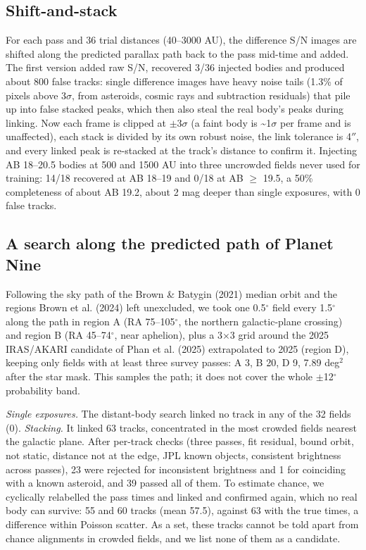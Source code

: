 \documentclass[twocolumn]{aastex631}
\begin{document}
\subsection{Shift-and-stack}
For each pass and 36 trial distances (40--3000 AU), the difference S/N images are shifted along the predicted parallax path back to the pass mid-time and added. The first version added raw S/N, recovered 3/36 injected bodies and produced about 800 false tracks: single difference images have heavy noise tails (1.3\% of pixels above 3$\sigma$, from asteroids, cosmic rays and subtraction residuals) that pile up into false stacked peaks, which then also steal the real body's peaks during linking. Now each frame is clipped at $\pm$3$\sigma$ (a faint body is \textasciitilde{}1$\sigma$ per frame and is unaffected), each stack is divided by its own robust noise, the link tolerance is 4$''$, and every linked peak is re-stacked at the track's distance to confirm it. Injecting AB 18--20.5 bodies at 500 and 1500 AU into three uncrowded fields never used for training: 14/18 recovered at AB 18--19 and 0/18 at AB $\ge$ 19.5, a 50\% completeness of about AB 19.2, about 2 mag deeper than single exposures, with 0 false tracks.

\subsection{A search along the predicted path of Planet Nine}
Following the sky path of the Brown \& Batygin (2021) median orbit and the regions Brown et al. (2024) left unexcluded, we took one 0.5$^\circ$ field every 1.5$^\circ$ along the path in region A (RA 75--105$^\circ$, the northern galactic-plane crossing) and region B (RA 45--74$^\circ$, near aphelion), plus a 3$\times$3 grid around the 2025 IRAS/AKARI candidate of Phan et al. (2025) extrapolated to 2025 (region D), keeping only fields with at least three survey passes: A 3, B 20, D 9, 7.89 deg$^2$ after the star mask. This samples the path; it does not cover the whole $\pm$12$^\circ$ probability band.

\emph{Single exposures.} The distant-body search linked no track in any of the 32 fields (0). \emph{Stacking.} It linked 63 tracks, concentrated in the most crowded fields nearest the galactic plane. After per-track checks (three passes, fit residual, bound orbit, not static, distance not at the edge, JPL known objects, consistent brightness across passes), 23 were rejected for inconsistent brightness and 1 for coinciding with a known asteroid, and 39 passed all of them. To estimate chance, we cyclically relabelled the pass times and linked and confirmed again, which no real body can survive: 55 and 60 tracks (mean 57.5), against 63 with the true times, a difference within Poisson scatter. As a set, these tracks cannot be told apart from chance alignments in crowded fields, and we list none of them as a candidate.
\end{document}
